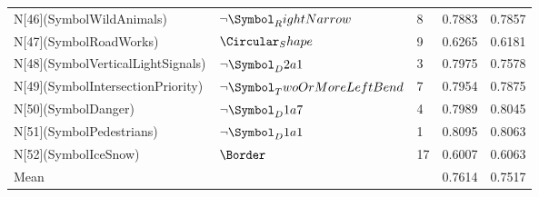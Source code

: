 \begin{tabular}{lllll}
N[46](SymbolWildAnimals) & $\neg \Symbol_RightNarrow$ & 8 & 0.7883 & 0.7857 \\
N[47](SymbolRoadWorks) & $\Circular_Shape$ & 9 & 0.6265 & 0.6181 \\
N[48](SymbolVerticalLightSignals) & $\neg \Symbol_D2a1$ & 3 & 0.7975 & 0.7578 \\
N[49](SymbolIntersectionPriority) & $\neg \Symbol_TwoOrMoreLeftBend$ & 7 & 0.7954 & 0.7875 \\
N[50](SymbolDanger) & $\neg \Symbol_D1a7$ & 4 & 0.7989 & 0.8045 \\
N[51](SymbolPedestrians) & $\neg \Symbol_D1a1$ & 1 & 0.8095 & 0.8063 \\
N[52](SymbolIceSnow) & $\Border$ & 17 & 0.6007 & 0.6063 \\
Mean &  &  & 0.7614 & 0.7517 \\
\bottomrule
\end{tabular}

